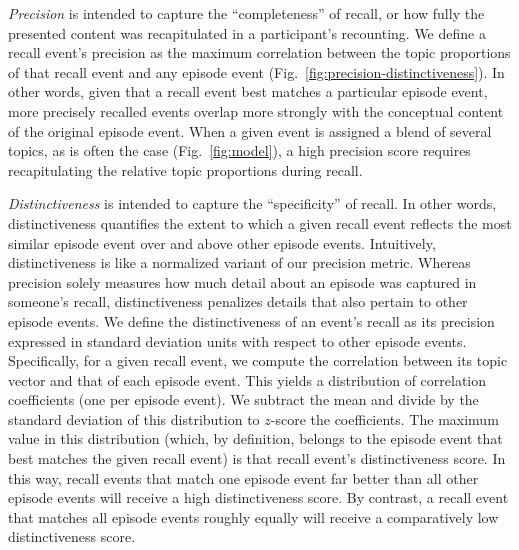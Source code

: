 \documentclass[10pt]{article}
\begin{document}
\textit{Precision} is intended to capture the ``completeness'' of recall, or how fully the presented content was recapitulated in a participant's recounting.  We define a recall event's precision as the maximum correlation between the topic proportions of that recall event and any episode event (Fig.~\ref{fig:precision-distinctiveness}).  In other words, given that a recall event best matches a particular episode event, more precisely recalled events overlap more strongly with the conceptual content of the original episode event.  When a given event is assigned a blend of several topics, as is often the case (Fig.~\ref{fig:model}), a high precision score requires recapitulating the relative topic proportions during recall.

\textit{Distinctiveness} is intended to capture the ``specificity'' of recall.  In other words, distinctiveness quantifies the extent to which a given recall event reflects the most similar episode event over and above other episode events.  Intuitively, distinctiveness is like a normalized variant of our precision metric.  Whereas precision solely measures how much detail about an episode was captured in someone's recall, distinctiveness penalizes details that also pertain to other episode events.  We define the distinctiveness of an event's recall as its precision expressed in standard deviation units with respect to other episode events.  Specifically, for a given recall event, we compute the correlation between its topic vector and that of each episode event.  This yields a distribution of correlation coefficients (one per episode event).  We subtract the mean and divide by the standard deviation of this distribution to $z$-score the coefficients.  The maximum value in this distribution (which, by definition, belongs to the episode event that best matches the given recall event) is that recall event's distinctiveness score.  In this way, recall events that match one episode event far better than all other episode events will receive a high distinctiveness score.  By contrast, a recall event that matches all episode events roughly equally will receive a comparatively low distinctiveness score.
\end{document}
